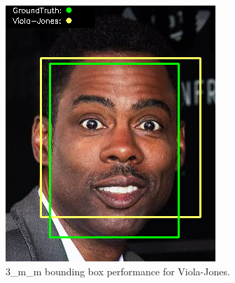 \documentclass{l4proj}
\begin{document}
\begin{appendices}
\begin{figure}[h!]
\begin{minipage}{0.49\textwidth}
     \includegraphics[width=\textwidth]{images/appendix/viola/3.png}
    \caption{3\_m\_m bounding box performance for Viola-Jones.}
    \label{whoopi_result}
  \end{minipage}
\end{figure}


\end{appendices}
\end{document}
